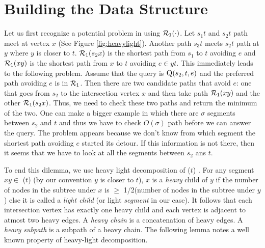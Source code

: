 \iflong
\else
\vspace{-2mm}
\fi
\iflong
\else

\fi
\section{Building the Data Structure}
\iflong
\else
\vspace{-4mm}
\fi
\label{sec:data}

Let us first recognize a potential problem in using $\mathcal{R}_1(\cdot)$.
Let $s_1t$ and $s_2t$ path  meet at vertex $x$ (See Figure \ref{fig:heavylight}).
Another path $s_3t$
 meets $s_2t$ path at $y$ where $y$ is closer to $t$.
$\mathcal{R}_1(s_2x)$ is the shortest path from $s_1$ to $t$ avoiding $e$ and $\mathcal{R}_1(xy)$ is the shortest path from
$x$ to $t$ avoiding $e \in yt $. This immediately leads to the following problem. Assume that
the query is $\textsc{Q}(s_2,t,e)$ and the preferred path avoiding $e$ is in $\mathcal{R}_1$.
Then there are two  candidate paths that avoid
$e$: one that goes from $s_2$ to the intersection vertex $x$ and then take
path  $\mathcal{R}_1(xy)$ and the other $\mathcal{R}_1(s_2x)$.
Thus, we need to check these two paths and return the minimum of the two. One can
make a bigger example in which there are $\sigma$ segments between $s_2$ and $t$
and thus we have to check $O(\sigma)$ path before we can answer the query. The problem appears
because we don't know from which segment the shortest path avoiding $e$ started its detour.
If this information is not there, then it seems that we have to look at all the segments between
$s_2$ ans $t$.
\iflong

\fi
To end this dilemma, we use heavy light decomposition of \SBFS($t$) \cite{SleatorT83}.
For any segment $xy \in$ \SBFS($t$) (by our convention $y$ is closer to $t$), $x$ is a {\em heavy}
child of $y$ if the number of nodes in the subtree under $x$ is $\ge$ 1/2(number of
nodes in the subtree under $y$) else it is called a {\em light child} (or light {\em segment} in our case).
It follows
that each intersection vertex has exactly one heavy child and
each vertex is adjacent to atmost two heavy edges. A {\em heavy chain} is a concatenation of
heavy edges. A {\em heavy subpath} is a subpath of a heavy chain.
The following lemma notes a well known property of heavy-light decomposition.

